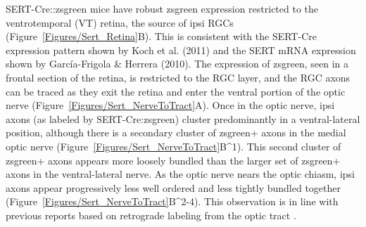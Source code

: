 SERT-Cre::zsgreen mice have robust zsgreen expression restricted to the ventrotemporal (VT) retina, the source of ipsi RGCs (Figure~\ref{Figures/Sert_Retina}B).
This is consistent with the SERT-Cre expression pattern shown by Koch et al. (2011) and the SERT mRNA expression shown by Garc\'ia-Frigola \& Herrera (2010). 
The expression of zsgreen, seen in a frontal section of the retina, is restricted to the RGC layer, and the RGC axons can be traced as they exit the retina and enter the ventral portion of the optic nerve (Figure~\ref{Figures/Sert_NerveToTract}A).
Once in the optic nerve, ipsi axons (as labeled by SERT-Cre:zsgreen) cluster predominantly in a ventral-lateral position, although there is a secondary cluster of zsgreen+ axons in the medial optic nerve (Figure~\ref{Figures/Sert_NerveToTract}B^1).
This second cluster of zsgreen+ axons appears more loosely bundled than the larger set of zsgreen+ axons in the ventral-lateral nerve.
As the optic nerve nears the optic chiasm, ipsi axons appear progressively less well ordered and less tightly bundled together (Figure~\ref{Figures/Sert_NerveToTract}B^{2-4}).
This observation is in line with previous reports based on retrograde labeling from the optic tract \cite{colello1990early}.


